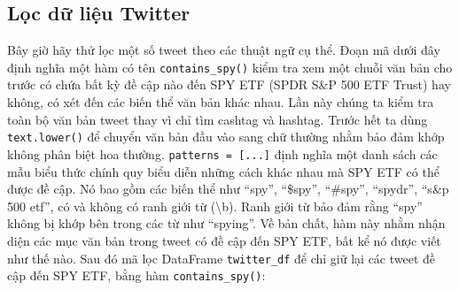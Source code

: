 \subsection{Lọc dữ liệu Twitter}

Bây giờ hãy thử lọc một số tweet theo các thuật ngữ cụ thể. Đoạn mã dưới đây định nghĩa một hàm có tên \texttt{contains\_spy()} kiểm tra xem một chuỗi văn bản cho trước có chứa bất kỳ đề cập nào đến SPY ETF (SPDR S\&P 500 ETF Trust) hay không, có xét đến các biến thể văn bản khác nhau. Lần này chúng ta kiểm tra toàn bộ văn bản tweet thay vì chỉ tìm cashtag và hashtag. Trước hết ta dùng \texttt{text.lower()} để chuyển văn bản đầu vào sang chữ thường nhằm bảo đảm khớp không phân biệt hoa thường. \texttt{patterns = [...]} định nghĩa một danh sách các mẫu biểu thức chính quy biểu diễn những cách khác nhau mà SPY ETF có thể được đề cập. Nó bao gồm các biến thể như ``spy'', ``\$spy'', ``\#spy'', ``spydr'', ``s\&p 500 etf'', có và không có ranh giới từ (\textbackslash b). Ranh giới từ bảo đảm rằng ``spy'' không bị khớp bên trong các từ như ``spying''. Về bản chất, hàm này nhằm nhận diện các mục văn bản trong tweet có đề cập đến SPY ETF, bất kể nó được viết như thế nào. Sau đó mã lọc DataFrame \texttt{twitter\_df} để chỉ giữ lại các tweet đề cập đến SPY ETF, bằng hàm \texttt{contains\_spy()}:

